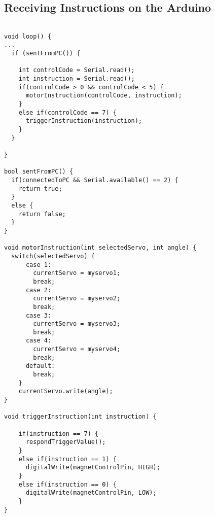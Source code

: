 \subsection{Receiving Instructions on the Arduino}
\lstset{language=C++}
\begin{lstlisting}

void loop() {
...
  if (sentFromPC()) {
 
    int controlCode = Serial.read();
    int instruction = Serial.read();
    if(controlCode > 0 && controlCode < 5) {
      motorInstruction(controlCode, instruction);
    }
    else if(controlCode == 7) {
      triggerInstruction(instruction);
    }
  }
  
}

bool sentFromPC() {
  if(connectedToPC && Serial.available() == 2) {
    return true;
  }
  else {
    return false;
  }
}

void motorInstruction(int selectedServo, int angle) {
  switch(selectedServo) {
      case 1:
        currentServo = myservo1;
        break;
      case 2:
        currentServo = myservo2;
        break;
      case 3:
        currentServo = myservo3;
        break;
      case 4:
        currentServo = myservo4;
        break;
      default:
        break;
    }
    currentServo.write(angle);
}

void triggerInstruction(int instruction) {
  
    if(instruction == 7) {
      respondTriggerValue();
    }
    else if(instruction == 1) {
      digitalWrite(magnetControlPin, HIGH);
    }
    else if(instruction == 0) {
      digitalWrite(magnetControlPin, LOW);
    }
}

\end{lstlisting}

